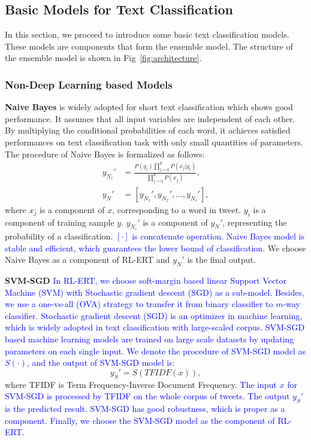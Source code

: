 \subsection{Basic Models for Text Classification}
\label{sec:deeplearning_model} 
In this section, we proceed to introduce some basic text classification models. These models are components that form the ensemble model. The structure of the ensemble model is shown in Fig~\ref{fig:architecture}.

\subsubsection{Non-Deep Learning based Models}
\textbf{Naive Bayes} \cite{DBLP:journals/ml/DomingosP97} is widely adopted for short text classification which shows good performance. It assumes that all input variables are independent of each other. By multiplying the conditional probabilities of each word, it achieves satisfied performances on text classification task with only small quantities of parameters. The procedure of Naive Bayes is formalized as follows:
\begin{align}\label{eq:nb}
y_{N_{i}}' &= \frac{P(y_i)\prod_{j = 0}^d P(x_j|y_i)}{\prod_{j = 0}^d P(x_j)},\\
y_N' &= [y_{N_{1}}',y_{N_{2}}',..., y_{N_{i}}'],
\end{align}
where $x_j$ is a component of $x$, corresponding to a word in tweet.  $y_i$ is a component of training sample $y$. $y_{N_{i}}'$ is a component of $y_N'$, representing the probability of a classification. \textcolor{blue}{$[\cdot]$ is concatenate operation. Naive Bayes model is stable and efficient, which guarantees the lower bound of classification.} We choose Naive Bayes as a component of RL-ERT and $y_N'$ is the final output.

\textbf{SVM-SGD} \cite{avriel2003nonlinear} \textcolor{blue}{In RL-ERT, we choose soft-margin based linear Support Vector Machine (SVM) with Stochastic gradient descent (SGD) as a sub-model. Besides, we use a one-vs-all (OVA) strategy to transfer it from binary classifier to $m$-way classifier. Stochastic gradient descent (SGD) is an optimizer in machine learning, which is widely adopted in text classification with large-scaled corpus. SVM-SGD based machine learning models are trained on large scale datasets by updating parameters on each single input. We denote the procedure of SVM-SGD model as $S(\cdot)$, and the output of SVM-SGD model is}:
\begin{equation}\label{eq:sgd}
y_S' = S(TFIDF(x)),
\end{equation}
where TFIDF is Term Frequency-Inverse Document Frequency. \textcolor{blue}{The input $x$ for SVM-SGD is processed by TFIDF on the whole corpus of tweets. The output $y_S'$ is the predicted result. SVM-SGD has good robustness, which is proper as a component.  Finally, we choose the SVM-SGD model as the component of RL-ERT.}

